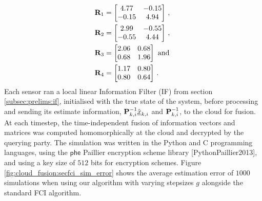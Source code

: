 \begin{equation}\label{eq:cloud_fusion:secfci_measurement_model_covariances}
    \begin{split}
        &{{\mathbf{R}}}_1 = 
        \begin{bmatrix}
            4.77 & -0.15\\
            -0.15 & 4.94
        \end{bmatrix}\,,\\
        &{{\mathbf{R}}}_2 = 
        \begin{bmatrix}
            2.99 & -0.55\\
            -0.55 & 4.44
        \end{bmatrix}\,,\\
        &{{\mathbf{R}}}_3 = 
        \begin{bmatrix}
            2.06 & 0.68\\
            0.68 & 1.96
        \end{bmatrix}\text{ and }\\
        &{{\mathbf{R}}}_4 = 
        \begin{bmatrix}
            1.17 & 0.80\\
            0.80 & 0.64
        \end{bmatrix}\,.
    \end{split}
\end{equation}
Each sensor ran a local linear Information Filter (IF) from section \ref{subsec:prelims:if}, initialised with the true state of the system, before processing and sending its estimate information, ${{\mathbf{P}}}_{k, i}^{-1}\hat{{\underline{x}}}_{k, i}$ and ${{\mathbf{P}}}_{k, i}^{-1}$, to the cloud for fusion. At each timestep, the time-independent fusion of information vectors and matrices was computed homomorphically at the cloud and decrypted by the querying party. The simulation was written in the Python and C programming languages, using the $\mathsf{phe}$ Paillier encryption scheme library [PythonPaillier2013], and using a key size of $512$ bits for encryption schemes. Figure \ref{fig:cloud_fusion:secfci_sim_error} shows the average estimation error of $1000$ simulations when using our algorithm with varying stepsizes $g$ alongside the standard FCI algorithm. 
